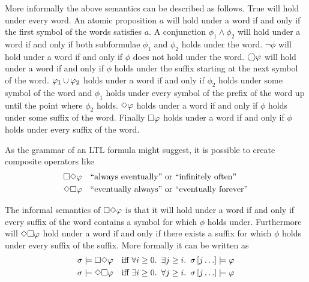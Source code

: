 More informally the above semantics can be described as follows. True will hold under every word. An atomic proposition $a$ will hold under a word if and only if the first symbol of the words satisfies $a$. A conjunction $\phi_1 \land \phi_2$ will hold under a word if and only if both subformulae $\phi_1$ and $\phi_2$ holds under the word. $\lnot \phi$ will hold under a word if and only if $\phi$ does not hold under the word. $\bigcirc\varphi$ will hold under a word if and only if $\phi$ holds under the suffix starting at the next symbol of the word. $\varphi_1 \cup \varphi_2$ holds under a word if and only if $\phi_2$ holds under some symbol of the word and $\phi_1$ holds under every symbol of the prefix of the word up until the point where $\phi_2$ holds. $\Diamond \varphi$ holds under a word if and only if $\phi$ holds under some suffix of the word. Finally $\square \varphi$ holds under a word if and only if $\phi$ holds under every suffix of the word.

As the grammar of an LTL formula might suggest, it is possible to create composite operators like
\begin{align*}
    &\square\Diamond\varphi \quad \text{``always eventually'' or ``infinitely often''}\\
    &\Diamond\square\varphi \quad \text{``eventually always'' or ``eventually forever''}
\end{align*}

The informal semantics of $\square\Diamond\varphi$ is that it will hold under a word if and only if every suffix of the word contains a symbol for which $\phi$ holds under. Furthermore will $\Diamond\square\varphi$ hold under a word if and only if there exists a suffix for which $\phi$ holds under every suffix of the suffix. More formally it can be written as~\cite{baier2008principles}
\begin{align*}
    \sigma &\models \square\Diamond \varphi &\text{iff }& \forall i \geq 0.\enskip \exists j \geq i.\enskip \sigma\left[j\ldots\right] \models \varphi \\
    \sigma &\models \Diamond\square \varphi &\text{iff }& \exists i \geq 0.\enskip \forall j \geq i.\enskip \sigma\left[j\ldots\right] \models \varphi
\end{align*}

